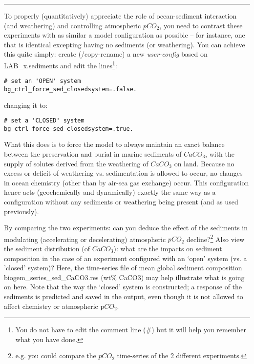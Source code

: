 \documentclass[11pt,fleqn]{book} %
\begin{document}
\vspace{1mm}
\noindent\rule{4cm}{0.1mm}
\vspace{2mm}

\vspace{16mm}
\pagebreak

\noindent To properly (quantitatively) appreciate the role of ocean-sediment interaction (and weathering) and controlling atmospheric \(pCO_{2}\), you need to contrast these experiments with as similar a model configuration as possible -- for instance, one that is identical excepting having no sediments (or weathering). You can achieve this quite simply: create (/copy-rename) a new \textit{user-config} based on \textsf{\footnotesize LAB\_x.sediments }and edit the lines\footnote{You do not have to edit the comment line (\#) but it will help you remember what you have done.}:
\vspace{-1mm}\small\begin{verbatim}
# set an 'OPEN' system
bg_ctrl_force_sed_closedsystem=.false.
\end{verbatim}\normalsize\vspace{-1mm}
changing it to:
\vspace{-1mm}\small\begin{verbatim}
# set a 'CLOSED' system
bg_ctrl_force_sed_closedsystem=.true.
\end{verbatim}\normalsize\vspace{-1mm}

What this  does is to force the model to always maintain an exact balance between the preservation and burial in marine sediments of \(CaCO_{3}\), with the supply of solutes derived from the weathering of \(CaCO_{3}\) on land. Because no excess or deficit of  weathering vs. sedimentation is  allowed to occur, no changes in ocean chemistry (other than by air-sea gas exchange) occur. This configuration hence acts (geochemically and dynamically) exactly the same way as a configuration without any sediments or weathering being present (and as used previously).

By comparing the two experiments: can you deduce the effect of the sediments in modulating (accelerating or decelerating) atmospheric \(pCO_{2}\) decline?\footnote{e.g. you could compare the \(pCO_{2}\) time-series of the 2 different experiments.}  Also view the sediment distribution (of \(CaCO_{3}\)): what are the impacts on sediment composition in the case of an experiment configured with an ‘open’ system (vs. a 'closed' system)? Here, the time-series file of mean global sediment composition biogem\_series\_sed\_CaCO3.res (wt\% CaCO3) may help illustrate what is going on here.
Note that the way the ‘closed’ system is constructed; a response of the sediments is predicted and saved in the output, even though it is not allowed to affect chemistry or atmospheric p\(CO_{2}\).
\end{document}
